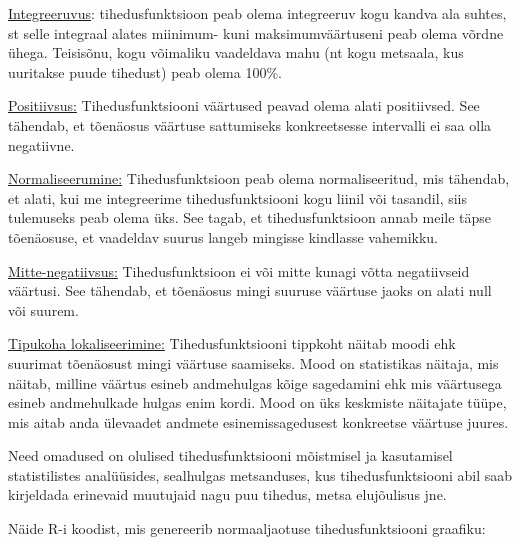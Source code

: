 \documentclass[
]{book}
\newenvironment{Shaded}{\begin{snugshade}}{\end{snugshade}}
\newcommand{\AttributeTok}[1]{\textcolor[rgb]{0.13,0.29,0.53}{#1}}
\newcommand{\CommentTok}[1]{\textcolor[rgb]{0.56,0.35,0.01}{\textit{#1}}}
\newcommand{\DecValTok}[1]{\textcolor[rgb]{0.00,0.00,0.81}{#1}}
\newcommand{\FloatTok}[1]{\textcolor[rgb]{0.00,0.00,0.81}{#1}}
\newcommand{\FunctionTok}[1]{\textcolor[rgb]{0.13,0.29,0.53}{\textbf{#1}}}
\newcommand{\NormalTok}[1]{#1}
\newcommand{\OtherTok}[1]{\textcolor[rgb]{0.56,0.35,0.01}{#1}}
\newcommand{\SpecialCharTok}[1]{\textcolor[rgb]{0.81,0.36,0.00}{\textbf{#1}}}
\newcommand{\StringTok}[1]{\textcolor[rgb]{0.31,0.60,0.02}{#1}}
\renewenvironment{Shaded} {\begin{snugshade}\footnotesize} {\end{snugshade}}
\begin{document}
\href{https://sonaveeb.ee/search/unif/dlall/aso/integreeruvus/1/est}{Integreeruvus}: tihedusfunktsioon peab olema integreeruv kogu kandva ala suhtes, st selle integraal alates miinimum- kuni maksimumväärtuseni peab olema võrdne ühega. Teisisõnu, kogu võimaliku vaadeldava mahu (nt kogu metsaala, kus uuritakse puude tihedust) peab olema 100\%.

\href{https://sonaveeb.ee/search/unif/dlall/aso/positiivsus:/1/est}{Positiivsus:} Tihedusfunktsiooni väärtused peavad olema alati positiivsed. See tähendab, et tõenäosus väärtuse sattumiseks konkreetsesse intervalli ei saa olla negatiivne.

\href{https://sonaveeb.ee/search/unif/dlall/aso/normaliseerumine:/1/est}{Normaliseerumine:} Tihedusfunktsioon peab olema normaliseeritud, mis tähendab, et alati, kui me integreerime tihedusfunktsiooni kogu liinil või tasandil, siis tulemuseks peab olema üks. See tagab, et tihedusfunktsioon annab meile täpse tõenäosuse, et vaadeldav suurus langeb mingisse kindlasse vahemikku.

\href{https://sonaveeb.ee/search/unif/dlall/aso/mitte-negatiivsus:/1/est}{Mitte-negatiivsus:} Tihedusfunktsioon ei või mitte kunagi võtta negatiivseid väärtusi. See tähendab, et tõenäosus mingi suuruse väärtuse jaoks on alati null või suurem.

\href{https://sonaveeb.ee/search/unif/dlall/aso/tipukoha\%20lokaliseerimine:/1/est}{Tipukoha lokaliseerimine:} Tihedusfunktsiooni tippkoht näitab moodi ehk suurimat tõenäosust mingi väärtuse saamiseks. Mood on statistikas näitaja, mis näitab, milline väärtus esineb andmehulgas kõige sagedamini ehk mis väärtusega esineb andmehulkade hulgas enim kordi. Mood on üks keskmiste näitajate tüüpe, mis aitab anda ülevaadet andmete esinemissagedusest konkreetse väärtuse juures.

Need omadused on olulised tihedusfunktsiooni mõistmisel ja kasutamisel statistilistes analüüsides, sealhulgas metsanduses, kus tihedusfunktsiooni abil saab kirjeldada erinevaid muutujaid nagu puu tihedus, metsa elujõulisus jne.

Näide R-i koodist, mis genereerib normaaljaotuse tihedusfunktsiooni graafiku:

\begin{Shaded}
\end{Shaded}
\end{document}
